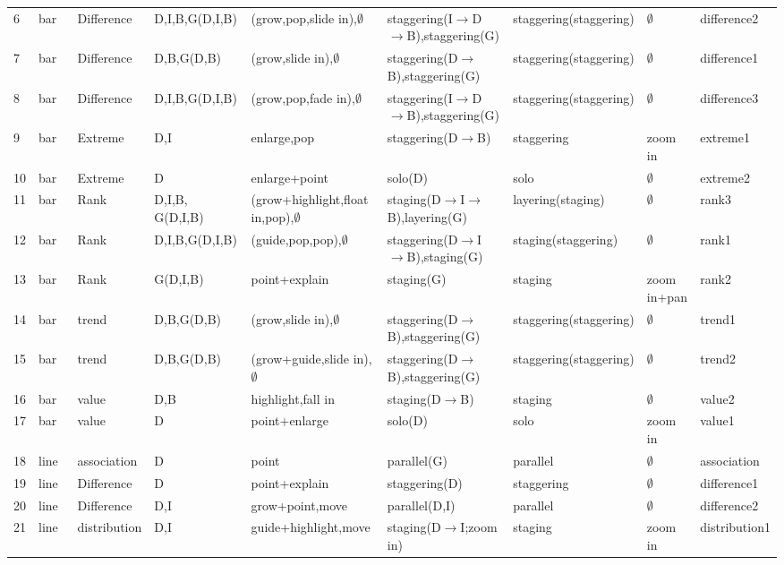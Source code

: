 \begin{landscape}
\begin{longtable}{p{0.035\linewidth}p{0.075\linewidth}p{0.09\linewidth}p{0.13\linewidth}p{0.19\linewidth}p{0.22\linewidth}p{0.13\linewidth}p{0.075\linewidth}p{0.08\linewidth}}
6 & bar & Difference & D,I,B,G(D,I,B) & (grow,pop,slide in),$\emptyset$ & staggering(I$\rightarrow$D$\rightarrow$B),staggering(G) & staggering(staggering) & $\emptyset$ & difference2 \\
7 & bar & Difference & D,B,G(D,B) & (grow,slide in),$\emptyset$ & staggering(D$\rightarrow$B),staggering(G) & staggering(staggering) & $\emptyset$ & difference1 \\
8 & bar & Difference & D,I,B,G(D,I,B) & (grow,pop,fade in),$\emptyset$ & staggering(I$\rightarrow$D$\rightarrow$B),staggering(G) & staggering(staggering) & $\emptyset$ & difference3 \\
9 & bar & Extreme & D,I & enlarge,pop & staggering(D$\rightarrow$B) & staggering & zoom in & extreme1 \\
10 & bar & Extreme & D & enlarge+point & solo(D) & solo & $\emptyset$ & extreme2 \\
11 & bar & Rank & D,I,B, G(D,I,B) & (grow+highlight,float in,pop),$\emptyset$ & staging(D$\rightarrow$I$\rightarrow$B),layering(G) & layering(staging) & $\emptyset$ & rank3 \\
12 & bar & Rank & D,I,B,G(D,I,B) & (guide,pop,pop),$\emptyset$ & staggering(D$\rightarrow$I$\rightarrow$B),staging(G) & staging(staggering) & $\emptyset$ & rank1 \\
13 & bar & Rank & G(D,I,B) & point+explain & staging(G) & staging & zoom in+pan & rank2 \\
14 & bar & trend & D,B,G(D,B) & (grow,slide in),$\emptyset$ & staggering(D$\rightarrow$B),staggering(G) & staggering(staggering) & $\emptyset$ & trend1 \\
15 & bar & trend & D,B,G(D,B) & (grow+guide,slide in),$\emptyset$ & staggering(D$\rightarrow$B),staggering(G) & staggering(staggering) & $\emptyset$ & trend2 \\
16 & bar & value & D,B & highlight,fall in & staging(D$\rightarrow$B) & staging & $\emptyset$ & value2 \\
17 & bar & value & D & point+enlarge & solo(D) & solo & zoom in & value1 \\
18 & line & association & D & point & parallel(G) & parallel & $\emptyset$ & association \\
19 & line & Difference & D & point+explain & staggering(D) & staggering & $\emptyset$ & difference1 \\
20 & line & Difference & D,I & grow+point,move & parallel(D,I) & parallel & $\emptyset$ & difference2 \\
21 & line & distribution & D,I & guide+highlight,move & staging(D$\rightarrow$I;zoom in) & staging & zoom in & distribution1 \\

\end{longtable}
\end{landscape}
